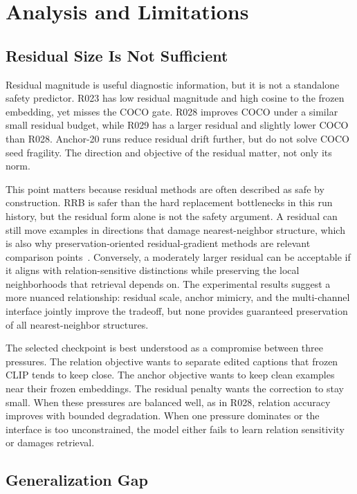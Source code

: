 \section{Analysis and Limitations}

\subsection{Residual Size Is Not Sufficient}

Residual magnitude is useful diagnostic information, but it is not a standalone safety predictor. R023 has low residual magnitude and high cosine to the frozen embedding, yet misses the COCO gate. R028 improves COCO under a similar small residual budget, while R029 has a larger residual and slightly lower COCO than R028. Anchor-20 runs reduce residual drift further, but do not solve COCO seed fragility. The direction and objective of the residual matter, not only its norm.

This point matters because residual methods are often described as safe by construction. RRB is safer than the hard replacement bottlenecks in this run history, but the residual form alone is not the safety argument. A residual can still move examples in directions that damage nearest-neighbor structure, which is also why preservation-oriented residual-gradient methods are relevant comparison points~\cite{luo2026keeplora}. Conversely, a moderately larger residual can be acceptable if it aligns with relation-sensitive distinctions while preserving the local neighborhoods that retrieval depends on. The experimental results suggest a more nuanced relationship: residual scale, anchor mimicry, and the multi-channel interface jointly improve the tradeoff, but none provides guaranteed preservation of all nearest-neighbor structures.

The selected checkpoint is best understood as a compromise between three pressures. The relation objective wants to separate edited captions that frozen CLIP tends to keep close. The anchor objective wants to keep clean examples near their frozen embeddings. The residual penalty wants the correction to stay small. When these pressures are balanced well, as in R028, relation accuracy improves with bounded degradation. When one pressure dominates or the interface is too unconstrained, the model either fails to learn relation sensitivity or damages retrieval.

\subsection{Generalization Gap}

